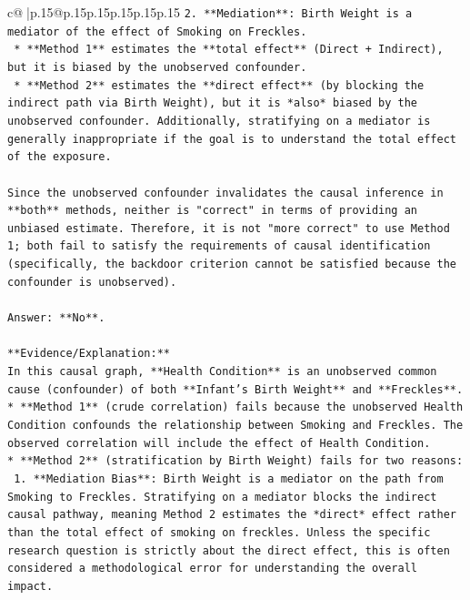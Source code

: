 \documentclass{article}
\begin{document}
{\begin{supertabular}{c@{$\;$}|p{.15\linewidth}@{}p{.15\linewidth}p{.15\linewidth}p{.15\linewidth}p{.15\linewidth}p{.15\linewidth}}
{{{\texttt{2.  **Mediation**: Birth Weight is a mediator of the effect of Smoking on Freckles.} \\
\texttt{    *   **Method 1** estimates the **total effect** (Direct + Indirect), but it is biased by the unobserved confounder.} \\
\texttt{    *   **Method 2** estimates the **direct effect** (by blocking the indirect path via Birth Weight), but it is *also* biased by the unobserved confounder. Additionally, stratifying on a mediator is generally inappropriate if the goal is to understand the total effect of the exposure.} \\
\\ 
\texttt{Since the unobserved confounder invalidates the causal inference in **both** methods, neither is "correct" in terms of providing an unbiased estimate. Therefore, it is not "more correct" to use Method 1; both fail to satisfy the requirements of causal identification (specifically, the backdoor criterion cannot be satisfied because the confounder is unobserved).} \\
\\ 
\texttt{Answer: **No**.} \\
\\ 
\texttt{**Evidence/Explanation:**} \\
\texttt{In this causal graph, **Health Condition** is an unobserved common cause (confounder) of both **Infant's Birth Weight** and **Freckles**.} \\
\texttt{*   **Method 1** (crude correlation) fails because the unobserved Health Condition confounds the relationship between Smoking and Freckles. The observed correlation will include the effect of Health Condition.} \\
\texttt{*   **Method 2** (stratification by Birth Weight) fails for two reasons:} \\
\texttt{    1.  **Mediation Bias**: Birth Weight is a mediator on the path from Smoking to Freckles. Stratifying on a mediator blocks the indirect causal pathway, meaning Method 2 estimates the *direct* effect rather than the total effect of smoking on freckles. Unless the specific research question is strictly about the direct effect, this is often considered a methodological error for understanding the overall impact.} \\
}}}
\end{supertabular}}
\end{document}
